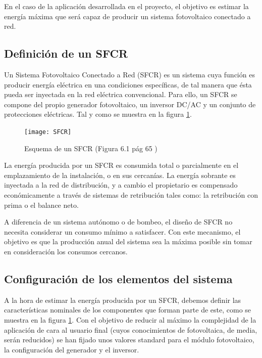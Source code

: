 En el caso de la aplicación desarrollada en el proyecto, el objetivo es estimar la energía máxima que será capaz de producir un sistema fotovoltaico conectado a red.

\subsection{Definición de un SFCR}

Un Sistema Fotovoltaico Conectado a Red (SFCR) es un sistema cuya función es producir energía eléctrica en una condiciones específicas, de tal manera que ésta pueda ser inyectada en la red eléctrica convencional. Para ello, un SFCR se compone del propio generador fotovoltaico, un inversor DC/AC y un conjunto de protecciones eléctricas. Tal y como se muestra en la figura \ref{fig:sfcr}.

\begin{figure}[ht]
\texttt{[image: SFCR]}
\centering
\caption{Esquema de un SFCR (Figura 6.1 pág 65 \cite{esf_book})}
\label{fig:sfcr}
\end{figure}

La energía producida por un SFCR es consumida total o parcialmente en el emplazamiento de la instalación, o en sus cercanías. La energía sobrante es inyectada a la red de distribución, y a cambio el propietario es compensado económicamente a través de sistemas de retribución tales como: la retribución con prima o el balance neto.

A diferencia de un sistema autónomo o de bombeo, el diseño de SFCR no necesita considerar un consumo mínimo a satisfacer. Con este mecanismo, el objetivo es que la producción anual del sistema sea la máxima posible sin tomar en consideración los consumos cercanos.

\subsection{Configuración de los elementos del sistema}

A la hora de estimar la energía producida por un SFCR, debemos definir las características nominales de los componentes que forman parte de este, como se muestra en la figura \ref{fig:sfcr}.
Con el objetivo de reducir al máximo la complejidad de la aplicación de cara al usuario final (cuyos conocimientos de fotovoltaica, de media, serán reducidos) se han fijado unos valores standard para el módulo fotovoltaico, la configuración del generador y el inversor.

\newpage


